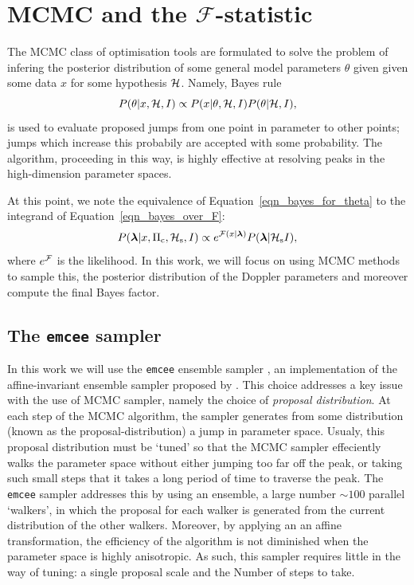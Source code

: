 \documentclass[aps, prd, twocolumn, superscriptaddress, floatfix, showpacs, nofootinbib, longbibliography]{revtex4-1}
\begin{document}
\section{MCMC and the $\mathcal{F}$-statistic}
\label{sec_MCMC_and_the_F_statistic}

The MCMC class of optimisation tools are formulated to solve the problem of
infering the posterior distribution of some general model parameters $\theta$
given given some data $x$ for some hypothesis $\mathcal{H}$. Namely, Bayes rule
\begin{equation}
P(\theta| x, \mathcal{H}, I) \propto P(x| \theta, \mathcal{H}, I)P(\theta| \mathcal{H}, I),
\label{eqn_bayes_for_theta}
\end{equation}
is used to evaluate proposed jumps from one point in parameter to other points;
jumps which increase this probabily are accepted with some probability. The
algorithm, proceeding in this way, is highly effective at resolving peaks in
the high-dimension parameter spaces.

At this point, we note the equivalence of Equation~\eqref{eqn_bayes_for_theta}
to the integrand of Equation~\eqref{eqn_bayes_over_F}:
\begin{equation}
P(\boldsymbol{\mathbf{\lambda}} | x, \Pi_{\rm c}, \mathcal{H}_{\rm s}, I)
\propto e^{{\mathcal{F}}(x| \boldsymbol{\mathbf{\lambda}})} P(\boldsymbol{\mathbf{\lambda}}| \mathcal{H}_{\rm s} I),
\label{eqn_lambda_posterior}
\end{equation}
where $e^{{\mathcal{F}}}$ is the likelihood.
In this work, we will focus on using MCMC methods to sample this, the
posterior distribution of the Doppler parameters and moreover compute the
final Bayes factor.

\subsection{The \texttt{emcee} sampler}

In this work we will use the \texttt{emcee} ensemble sampler
\citep{foreman-mackay2013}, an implementation of the affine-invariant ensemble
sampler proposed by \citet{goodman2010}. This choice addresses a key issue with
the use of MCMC sampler, namely the choice of \emph{proposal distribution}. At
each step of the MCMC algorithm, the sampler generates from some distribution
(known as the proposal-distribution) a jump in parameter space. Usualy, this
proposal distribution must be `tuned' so that the MCMC sampler effeciently
walks the parameter space without either jumping too far off the peak, or
taking such small steps that it takes a long period of time to traverse the
peak. The \texttt{emcee} sampler addresses this by using an ensemble, a large
number ${\sim}100$ parallel `walkers', in which the proposal for each walker
is generated from the current distribution of the other walkers. Moreover, by
applying an an affine transformation, the efficiency of the algorithm is not
diminished when the parameter space is highly anisotropic. As such, this
sampler requires little in the way of tuning: a single proposal scale and the
Number of steps to take.
\end{document}
